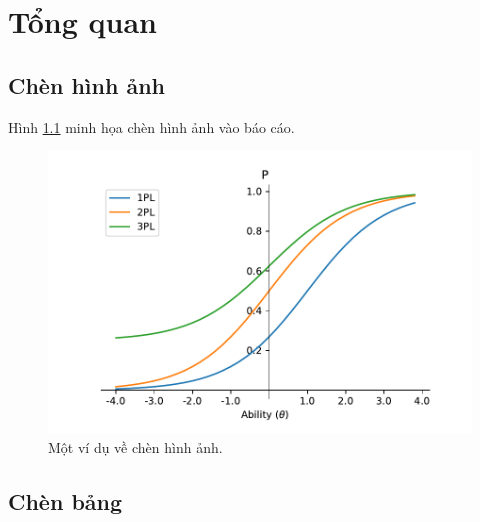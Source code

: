 \chapter{Tổng quan}\label{chapter_overview}


\section{Chèn hình ảnh}

Hình \ref{icc_plot} minh họa chèn hình ảnh vào báo cáo.

\begin{center}
    \begin{figure}[h!]
        \begin{center}
            \includegraphics[scale=0.5]{figs/ICC_plots.pdf}
        \end{center}
        \caption{Một ví dụ về chèn hình ảnh.}
        \label{icc_plot}
    \end{figure}
\end{center}

\section{Chèn bảng}

